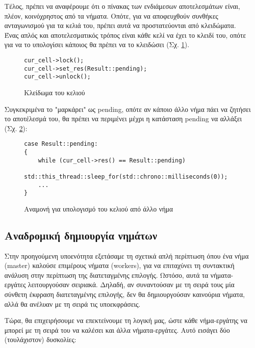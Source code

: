 Τέλος, πρέπει να αναφέρουμε ότι ο πίνακας των ενδιάμεσων αποτελεσμάτων είναι, πλέον, κοινόχρηστος από τα νήματα.
Οπότε, για να αποφευχθούν συνθήκες ανταγωνισμού για τα κελιά του, πρέπει αυτά να προστατεύονται από κλειδώματα.
Ένας απλός και αποτελεσματικός τρόπος είναι κάθε κελί να έχει το κλειδί του, οπότε για να το υπολογίσει κάποιος θα πρέπει να το κλειδώσει (Σχ. \ref{fig:lock}).

\begin{figure}[h]
\setlength\partopsep{-\topsep}%
\begin{verbatim}
cur_cell->lock();
cur_cell->set_res(Result::pending);
cur_cell->unlock();
\end{verbatim}
  \caption{Κλείδωμα του κελιού}
\label{fig:lock}
\end{figure}

Συγκεκριμένα το "μαρκάρει" ως pending, οπότε αν κάποιο άλλο νήμα πάει να ζητήσει το αποτέλεσμά του, θα πρέπει να περιμένει μέχρι η κατάσταση pending να αλλάξει (Σχ. \ref{fig:pending}):

\begin{figure}[h]
\setlength\partopsep{-\topsep}%
\begin{verbatim}
case Result::pending:
{
    while (cur_cell->res() == Result::pending) 
        std::this_thread::sleep_for(std::chrono::milliseconds(0));
    ...
}
\end{verbatim}
  \caption{Αναμονή για υπολογισμό του κελιού από άλλο νήμα}
\label{fig:pending}
\end{figure}

\newpage
\subsection{Αναδρομική δημιουργία νημάτων}

Στην προηγούμενη υποενότητα εξετάσαμε τη σχετικά απλή περίπτωση όπου ένα νήμα (master) καλούσε επιμέρους νήματα (workers), για να επιταχύνει τη συντακτική ανάλυση στην περίπτωση της διατεταγμένης επιλογής.
Ωστόσο, αυτά τα νήματα-εργάτες λειτουργούσαν σειριακά.
Δηλαδή, αν συναντούσαν με τη σειρά τους μία σύνθετη έκφραση διατεταγμένης επιλογής, δεν θα δημιουργούσαν καινούρια νήματα, αλλά θα ανέλυαν με τη σειρά τις υποεκφράσεις.

Τώρα, θα επιχειρήσουμε να επεκτείνουμε τη λογική μας, ώστε κάθε νήμα-εργάτης να μπορεί με τη σειρά του να καλέσει και άλλα νήματα-εργάτες.
Αυτό εισάγει δύο (τουλάχιστον) δυσκολίες:

